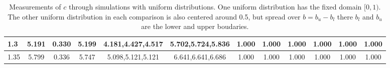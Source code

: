 \begin{table*}[h!]
\begin{center}
\begin{tabular}{| l | c | c | c | c | c | c | c | c | c | c | c |}
1.3 & 5.191 & 0.330 & 5.199 & 4.181,4.427,4.517 & 5.702,5.724,5.836  & 1.000  & 1.000  & 1.000  & 1.000  & 1.000  & 1.000 \\\hline
1.35 & 5.799 & 0.336 & 5.747 & 5.098,5.121,5.121 & 6.641,6.641,6.686  & 1.000  & 1.000  & 1.000  & 1.000  & 1.000  & 1.000 \\\hline
\end{tabular}
\caption{Measurements of $c$ through simulations
        with uniform distributions.
        One uniform distribution has the fixed domain $[0,1)$.
        The other uniform distribution in each comparison
        is also centered around 0.5,
        but spread over $b=b_u-b_l$ there $b_l$ and $b_u$ are the lower and upper boudaries.}
\end{center}
\end{table*}